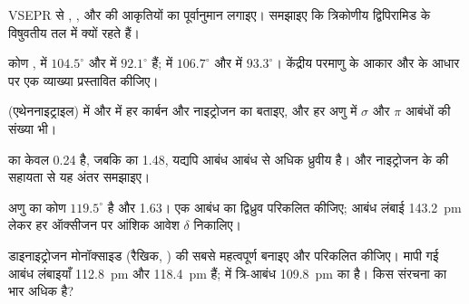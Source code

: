 \begin{exercise}[$\star\star$]\label{exo:b1:lewis-resonance-vsepr:7}
VSEPR से , ,  और
 की आकृतियों का पूर्वानुमान लगाइए। समझाइए कि त्रिकोणीय द्विपिरामिड के 
विषुवतीय तल में क्यों रहते हैं।
\end{exercise}

\begin{exercise}[$\star\star$]\label{exo:b1:lewis-resonance-vsepr:8}
कोण ,  में $104.5^\circ$ और
 में $92.1^\circ$ हैं;  में $106.7^\circ$ और  में $93.3^\circ$। केंद्रीय
परमाणु के आकार और  के आधार पर एक व्याख्या
प्रस्तावित कीजिए।
\end{exercise}

\begin{exercise}[$\star\star$]\label{exo:b1:lewis-resonance-vsepr:9}
 (एथेननाइट्राइल) में और  में हर कार्बन और
नाइट्रोजन का  बताइए, और हर अणु में
$\sigma$ और $\pi$ आबंधों की संख्या भी।
\end{exercise}

\begin{exercise}[$\star\star\star$]\label{exo:b1:lewis-resonance-vsepr:10}
 का  केवल \qty{0.24}{\debye} है, जबकि
 का \qty{1.48}{\debye}, यद्यपि  आबंध
 आबंध से अधिक ध्रुवीय है।  और नाइट्रोजन के
 की सहायता से यह अंतर समझाइए।
\end{exercise}

\begin{exercise}[$\star\star\star$]\label{exo:b1:lewis-resonance-vsepr:11}
 अणु का कोण $119.5^\circ$ है और 
\qty{1.63}{\debye}। एक  आबंध का द्विध्रुव परिकलित कीजिए; आबंध
लंबाई \qty{143.2}{pm} लेकर हर ऑक्सीजन पर आंशिक आवेश $\delta$
निकालिए।
\end{exercise}

\begin{exercise}[$\star\star\star$]\label{exo:b1:lewis-resonance-vsepr:12}
डाइनाइट्रोजन मोनॉक्साइड 
(रैखिक, ) की सबसे महत्वपूर्ण  बनाइए और  परिकलित कीजिए। मापी गई आबंध
लंबाइयाँ  \qty{112.8}{pm} और  \qty{118.4}{pm} हैं;
 में त्रि-आबंध \qty{109.8}{pm} का है। किस संरचना का भार
अधिक है?
\end{exercise}

